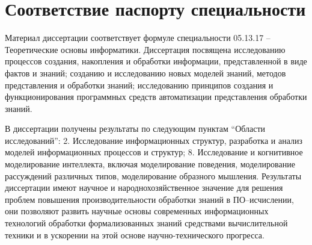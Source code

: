 


\section*{Соответствие паспорту специальности}
Материал диссертации соответствует формуле специальности 05.13.17 -- Теоретические основы информатики. Диссертация посвящена исследованию процессов создания, накопления и обработки информации, представленной в виде фактов и знаний; созданию и исследованию новых моделей знаний, методов представления и обработки знаний; исследованию принципов создания и функционирования программных средств автоматизации представления обработки знаний.

В диссертации получены результаты по следующим пунктам ``Области исследований'': 2. Исследование информационных структур, разработка и анализ моделей информационных процессов и структур; 8. Исследование и когнитивное моделирование интеллекта, включая моделирование поведения, моделирование рассуждений различных типов, моделирование образного мышления. Результаты диссертации имеют научное и народнохозяйственное значение для решения проблем повышения производительности обработки знаний в ПО--исчислении, они позволяют развить научные основы современных информационных технологий обработки формализованных знаний средствами вычислительной техники и в ускорении на этой основе научно-технического прогресса.


